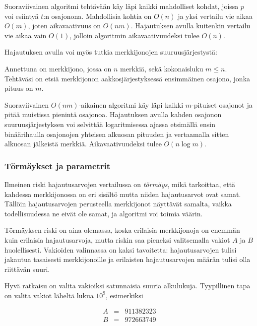 Suoraviivainen algoritmi tehtävään käy
läpi kaikki mahdolliset kohdat,
joissa $p$ voi esiintyä $t$:n osajonona.
Mahdollisia kohtia on $O(n)$ ja yksi vertailu
vie aikaa $O(m)$, joten aikavaativuus on $O(nm)$.
Hajautuksen avulla kuitenkin vertailu vie aikaa
vain $O(1)$, jolloin algoritmin aikavaativuudeksi tulee $O(n)$.

Hajautuksen avulla voi myös tutkia merkkijonojen
suuruusjärjestystä:

\begin{task}
Annettuna on merkkijono,
jossa on $n$ merkkiä,
sekä kokonaisluku $m \le n$.
Tehtäväsi on etsiä merkkijonon
aakkosjärjestyksessä ensimmäinen osajono,
jonka pituus on $m$.
\end{task}

Suoraviivainen $O(nm)$-aikainen algoritmi
käy läpi kaikki
$m$-pituiset osajonot ja pitää muistissa
pienintä osajonoa.
Hajautuksen avulla kahden osajonon
suuruusjärjestyksen voi selvittää logaritmisessa
ajassa etsimällä ensin binäärihaulla
osajonojen yhteisen alkuosan pituuden
ja vertaamalla sitten alkuosan jälkeistä merkkiä.
Aikavaativuudeksi tulee $O(n \log m)$.

\subsubsection*{Törmäykset ja parametrit}

Ilmeinen riski hajautusarvojen vertailussa
on \textit{törmäys}, mikä tarkoittaa, että kahdessa merkkijonossa on
eri sisältö mutta niiden hajautusarvot ovat samat.
Tällöin hajautusarvojen perusteella merkkijonot
näyttävät samalta, vaikka todellisuudessa ne eivät ole samat,
ja algoritmi voi toimia väärin.

Törmäyksen riski on aina olemassa,
koska erilaisia merkkijonoja on enemmän kuin
erilaisia hajautusarvoja,
mutta riskin saa pieneksi valitsemalla
vakiot $A$ ja $B$ huolellisesti.
Vakioiden valinnassa on kaksi tavoitetta:
hajautusarvojen tulisi
jakautua tasaisesti merkkijonoille
ja
erilaisten hajautusarvojen määrän tulisi
olla riittävän suuri.

Hyvä ratkaisu on valita vakioiksi satunnaisia suuria
alkulukuja. Tyypillinen tapa on valita vakiot
läheltä lukua $10^9$, esimerkiksi

\[
\begin{array}{lcl}
A & = & 911382323 \\
B & = & 972663749 \\
\end{array}
\]


